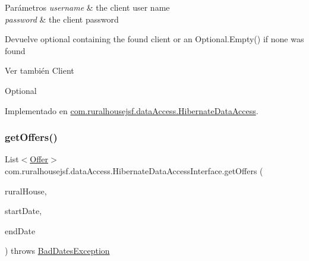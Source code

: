 \begin{DoxyParams}{Parámetros}
{\em username} & the client user name \\
\hline
{\em password} & the client password\\
\hline
\end{DoxyParams}
\begin{DoxyReturn}{Devuelve}
optional containing the found client or an {\ttfamily Optional.\+Empty()} if none was found
\end{DoxyReturn}
\begin{DoxySeeAlso}{Ver también}
Client 

Optional 
\end{DoxySeeAlso}


Implementado en \mbox{\hyperlink{classcom_1_1ruralhousejsf_1_1data_access_1_1_hibernate_data_access_a6df6a0502595b73be0f6d238743eeda5}{com.\+ruralhousejsf.\+data\+Access.\+Hibernate\+Data\+Access}}.

\mbox{\label{interfacecom_1_1ruralhousejsf_1_1data_access_1_1_hibernate_data_access_interface_a731ab9e6ef26732d453046c9630c677b}} 
\subsubsection{\texorpdfstring{getOffers()}{getOffers()}\hspace{0.1cm}{\footnotesize\ttfamily [1/2]}}
{\footnotesize\ttfamily List$<$\mbox{\hyperlink{classcom_1_1ruralhousejsf_1_1domain_1_1_offer}{Offer}}$>$ com.\+ruralhousejsf.\+data\+Access.\+Hibernate\+Data\+Access\+Interface.\+get\+Offers (\begin{DoxyParamCaption}\item[{\mbox{\hyperlink{classcom_1_1ruralhousejsf_1_1domain_1_1_rural_house}{Rural\+House}}}]{rural\+House,  }\item[{Local\+Date}]{start\+Date,  }\item[{Local\+Date}]{end\+Date }\end{DoxyParamCaption}) throws \mbox{\hyperlink{classcom_1_1ruralhousejsf_1_1exceptions_1_1_bad_dates_exception}{Bad\+Dates\+Exception}}}

